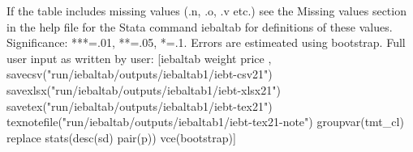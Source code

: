 If the table includes missing values (.n, .o, .v etc.) see the Missing values section in the help file for the Stata command iebaltab for definitions of these values. Significance: ***=.01, **=.05, *=.1. Errors are estimeated using bootstrap. Full user input as written by user: [iebaltab weight price , savecsv("run/iebaltab/outputs/iebaltab1/iebt-csv21") savexlsx("run/iebaltab/outputs/iebaltab1/iebt-xlsx21") savetex("run/iebaltab/outputs/iebaltab1/iebt-tex21") texnotefile("run/iebaltab/outputs/iebaltab1/iebt-tex21-note") groupvar(tmt\_cl) replace stats(desc(sd) pair(p)) vce(bootstrap)] 

